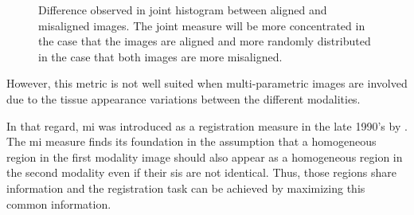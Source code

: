 \begin{figure}
\centering
	\hspace*{\fill}
	 \hfill
	\hspace*{\fill}
	\caption{Difference observed in joint histogram between aligned and misaligned images. The joint measure will be more concentrated in the case that the images are aligned and more randomly distributed in the case that both images are more misaligned.}
	\label{fig:jointhisto}
\end{figure}

However, this metric is not well suited when multi-parametric images are involved due to the tissue appearance variations between the different modalities.

In that regard, \ac{mi} was introduced as a registration measure in the late 1990's by \cite{Pluim2003}. The \ac{mi} measure finds its foundation in the assumption that a homogeneous region in the first modality image should also appear as a homogeneous region in the second modality even if their \acp{si} are not identical. Thus, those regions share information and the registration task can be achieved by maximizing this common information.%



